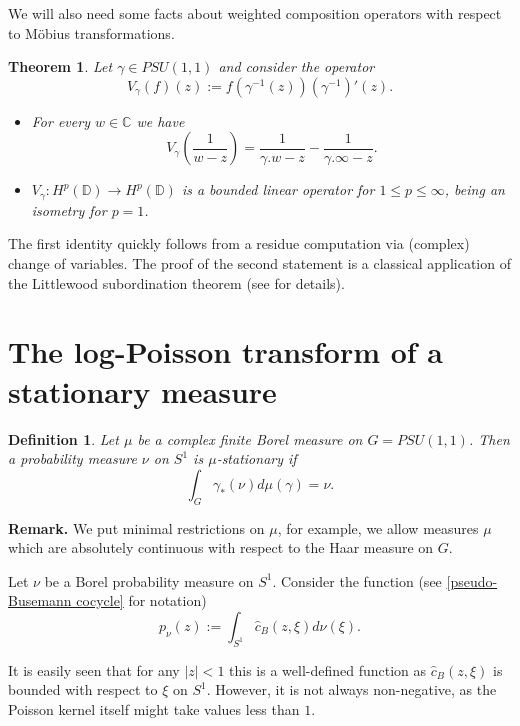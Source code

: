 \documentclass[11pt]{article}
\newtheorem{definition}{Definition}[section]
\newtheorem{theorem}{Theorem}[section]
\begin{document}
We will also need some facts about weighted composition operators with respect to M\"obius transformations.

\begin{theorem}
	\label{weighted composition ops}
	Let $\gamma \in PSU(1,1)$ and consider the operator
	\[
	V_\gamma(f)(z) := f(\gamma^{-1}(z)) (\gamma^{-1})'(z).
	\] 
	\begin{itemize}
		\item For every $w \in \mathbb{C}$ we have
		\[
		V_\gamma \left( \frac{1}{w - z} \right) = \frac{1}{\gamma.w - z} - \frac{1}{\gamma.\infty - z}.
		\]
		\item $V_\gamma : H^p(\mathbb{D}) \rightarrow H^p(\mathbb{D})$ is a bounded linear operator for $1 \le p \le \infty$, being an isometry for $p = 1$.
	\end{itemize}
\end{theorem}

The first identity quickly follows from a residue computation via (complex) change of variables. The proof of the second statement is a classical application of the Littlewood subordination theorem (see \cite{book:2131218} for details). 

\section{The log-Poisson transform of a stationary measure}
\label{The log-Poisson transform of a stationary measure}
\begin{definition}
	Let $\mu$ be a complex finite Borel measure on $G = PSU(1,1)$. Then a probability measure $\nu$ on $S^1$ is $\mu$-stationary if
	\begin{equation}
		\label{stationary measure}
		\int_G \gamma_*(\nu) d\mu(\gamma) = \nu.
	\end{equation}
\end{definition}

\textbf{Remark.} We put minimal restrictions on $\mu$, for example, we allow measures $\mu$ which are absolutely continuous with respect to the Haar measure on $G$.

Let $\nu$ be a Borel probability measure on $S^1$. Consider the function (see \eqref{pseudo-Busemann cocycle} for notation)
\begin{equation}
	\label{def of the special function}
	p_\nu(z) := \int_{S^1} \hat{c}_B(z, \xi) d \nu(\xi).
\end{equation}

It is easily seen that for any $|z| < 1$ this is a well-defined function as $\hat{c}_B(z, \xi)$ is bounded with respect to $\xi$ on $S^1$. However, it is not always non-negative, as the Poisson kernel itself might take values less than $1$.
\end{document}
